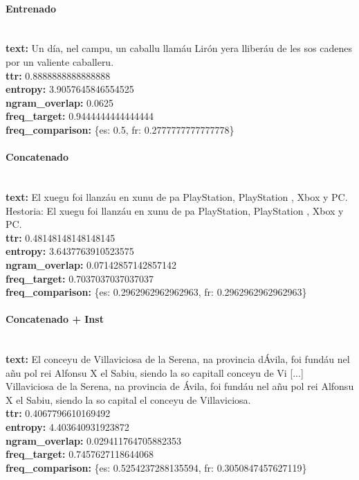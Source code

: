 \paragraph{Entrenado}~\\
\textbf{text:} Un día, nel campu, un caballu llamáu Lirón yera lliberáu de les sos cadenes por un valiente caballeru.\\
\textbf{ttr:} 0.8888888888888888\\
\textbf{entropy:} 3.9057645846554525\\
\textbf{ngram\_overlap:} 0.0625\\
\textbf{freq\_target:} 0.9444444444444444\\
\textbf{freq\_comparison:} \{\textquotesingle{}es\textquotesingle{}: 0.5, \textquotesingle{}fr\textquotesingle{}: 0.2777777777777778\}

\paragraph{Concatenado}~\\
\textbf{text:} El xuegu foi llanzáu en xunu de pa PlayStation, PlayStation , Xbox y PC. Hestoria: El xuegu foi llanzáu en xunu de pa PlayStation, PlayStation , Xbox y PC.\\
\textbf{ttr:} 0.48148148148148145\\
\textbf{entropy:} 3.6437763910523575\\
\textbf{ngram\_overlap:} 0.07142857142857142\\
\textbf{freq\_target:} 0.7037037037037037\\
\textbf{freq\_comparison:} \{\textquotesingle{}es\textquotesingle{}: 0.2962962962962963, \textquotesingle{}fr\textquotesingle{}: 0.2962962962962963\}

\paragraph{Concatenado + Inst}~\\
\textbf{text:} El conceyu de Villaviciosa de la Serena, na provincia d\textquotesingle{}Ávila, foi fundáu nel añu pol rei Alfonsu X el Sabiu, siendo la so capital\textquotesingle{}l conceyu de Vi [...]  Villaviciosa de la Serena, na provincia de Ávila, foi fundáu nel añu pol rei Alfonsu X el Sabiu, siendo la so capital el conceyu de Villaviciosa.\\
\textbf{ttr:} 0.4067796610169492\\
\textbf{entropy:} 4.403640931923872\\
\textbf{ngram\_overlap:} 0.029411764705882353\\
\textbf{freq\_target:} 0.7457627118644068\\
\textbf{freq\_comparison:} \{\textquotesingle{}es\textquotesingle{}: 0.5254237288135594, \textquotesingle{}fr\textquotesingle{}: 0.3050847457627119\}

